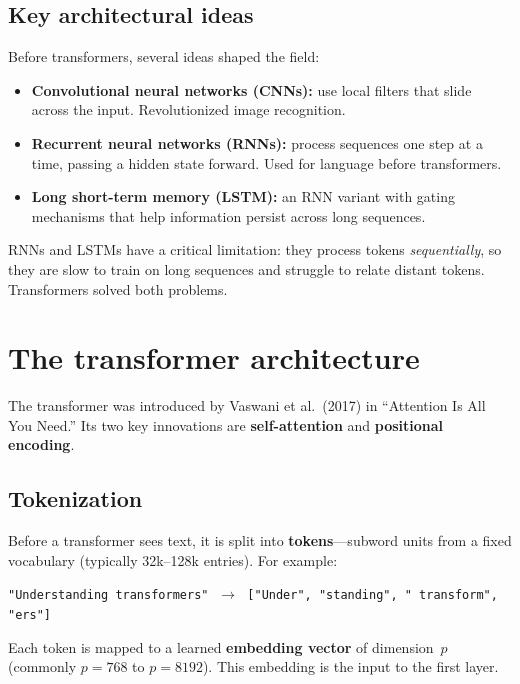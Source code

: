 \documentclass[11pt, twoside, openright]{memoir}
\begin{document}
\subsection{Key architectural ideas}

Before transformers, several ideas shaped the field:

\begin{itemize}[nosep]
\item \textbf{Convolutional neural networks (CNNs):} use local filters that
  slide across the input.  Revolutionized image recognition.
\item \textbf{Recurrent neural networks (RNNs):} process sequences one step
  at a time, passing a hidden state forward.  Used for language before
  transformers.
\item \textbf{Long short-term memory (LSTM):} an RNN variant with gating
  mechanisms that help information persist across long sequences.
\end{itemize}

RNNs and LSTMs have a critical limitation: they process tokens
\emph{sequentially}, so they are slow to train on long sequences and
struggle to relate distant tokens.  Transformers solved both problems.

\section{The transformer architecture}

The transformer was introduced by Vaswani et al.\ (2017) in ``Attention Is
All You Need.''  Its two key innovations are \textbf{self-attention} and
\textbf{positional encoding}.

\subsection{Tokenization}

Before a transformer sees text, it is split into \textbf{tokens}---subword
units from a fixed vocabulary (typically 32k--128k entries).  For example:

\begin{center}\small
\texttt{"Understanding transformers"} $\;\to\;$
\texttt{["Under", "standing", " transform", "ers"]}
\end{center}

Each token is mapped to a learned \textbf{embedding vector} of dimension~$p$
(commonly $p = 768$ to $p = 8192$).  This embedding is the input to the
first layer.
\end{document}
